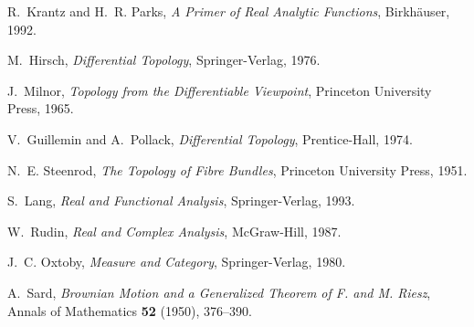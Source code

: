 \documentclass[11pt,a4paper]{article}
\theoremstyle{remark}
\begin{document}
\begin{thebibliography}{9}

R.~Krantz and H.~R. Parks, \emph{A Primer of Real Analytic Functions}, Birkh\"auser, 1992.

M.~Hirsch, \emph{Differential Topology}, Springer-Verlag, 1976.

J.~Milnor, \emph{Topology from the Differentiable Viewpoint}, Princeton University Press, 1965.

V.~Guillemin and A.~Pollack, \emph{Differential Topology}, Prentice-Hall, 1974.

N.~E. Steenrod, \emph{The Topology of Fibre Bundles}, Princeton University Press, 1951.

S.~Lang, \emph{Real and Functional Analysis}, Springer-Verlag, 1993.

W.~Rudin, \emph{Real and Complex Analysis}, McGraw-Hill, 1987.

J.~C. Oxtoby, \emph{Measure and Category}, Springer-Verlag, 1980.

A.~Sard, \emph{Brownian Motion and a Generalized Theorem of F. and M. Riesz}, Annals of Mathematics \textbf{52} (1950), 376--390.

\end{thebibliography}
\end{document}
